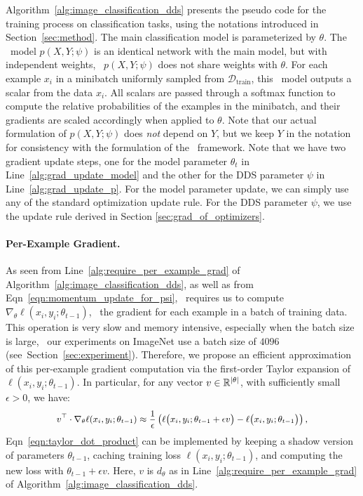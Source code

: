 Algorithm~\ref{alg:image_classification_dds} presents the pseudo code for the training process on classification tasks, using the notations introduced in Section~\ref{sec:method}. 
The main  classification model is parameterized by $\theta$. The \dds~model $p(X, Y; \psi)$ is an identical network with the main model, but with independent weights, \ie~$p(X, Y; \psi)$ does not share weights with $\theta$. For each example $x_i$ in a minibatch uniformly sampled from $\mathcal{D}_\text{train}$, this \dds~model outputs a scalar from the data $x_i$. All scalars are passed through a softmax function to compute the relative probabilities of the examples in the minibatch, and their gradients are scaled accordingly when applied to $\theta$. Note that our actual formulation of $p(X, Y; \psi)$ does \textit{not} depend on $Y$, but we keep $Y$ in the notation for consistency with the formulation of the \dds~framework. Note that we have two gradient update steps, one for the model parameter $\theta_t$ in Line~\ref{alg:grad_update_model} and the other for the DDS parameter $\psi$ in Line~\ref{alg:grad_update_p}. For the model parameter update, we can simply use any of the standard optimization update rule. For the DDS parameter $\psi$, we use the update rule derived in Section \ref{sec:grad_of_optimizers}.

\paragraph{Per-Example Gradient.} As seen from Line~\ref{alg:require_per_example_grad} of Algorithm~\ref{alg:image_classification_dds}, as well as from Eqn~\ref{eqn:momentum_update_for_psi}, \dds~requires us to compute $\nabla_\theta \ell(x_i, y_i; \theta_{t-1})$, \ie~the gradient for each example in a batch of training data. This operation is very slow and memory intensive, especially when the batch size is large, \eg~our experiments on ImageNet use a batch size of $4096$ (see~Section~\ref{sec:experiment}). Therefore, we propose an efficient approximation of this per-example gradient computation via the first-order Taylor expansion of $\ell(x_i, y_i; \theta_{t-1})$. In particular, for any vector $v \in \mathbb{R}^{\left| \theta \right|}$, with sufficiently small $\epsilon > 0$, we have:
    \vspace{-0.15cm}
\begin{equation}
  \label{eqn:taylor_dot_product}
  \small
  \begin{aligned}
    v^\top \cdot \nabla_\theta \ell(x_i, y_i; \theta_{t-1})
    \approx
    \frac{1}{\epsilon}
    \left(
      \ell\big( x_i, y_i; \theta_{t-1} + \epsilon v \big) -
      \ell\big( x_i, y_i; \theta_{t-1} \big)
    \right),
  \end{aligned}
\end{equation}
Eqn~\ref{eqn:taylor_dot_product} can be implemented by keeping a shadow version of parameters $\theta_{t-1}$, caching training loss $\ell(x_i, y_i; \theta_{t-1})$, and computing the new loss with $\theta_{t-1} + \epsilon v$. Here, $v$ is $d_\theta$ as in Line~\ref{alg:require_per_example_grad} of Algorithm~\ref{alg:image_classification_dds}.
